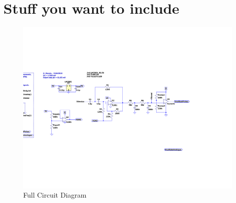      \chapter{Stuff you want to include}
     
\begin{figure}
    \centering
    \includegraphics[width=\textwidth]{./Figures/FullCircuit_cropped.pdf}
    \caption{Full Circuit Diagram}
    \label{fig:full circuit}
\end{figure}